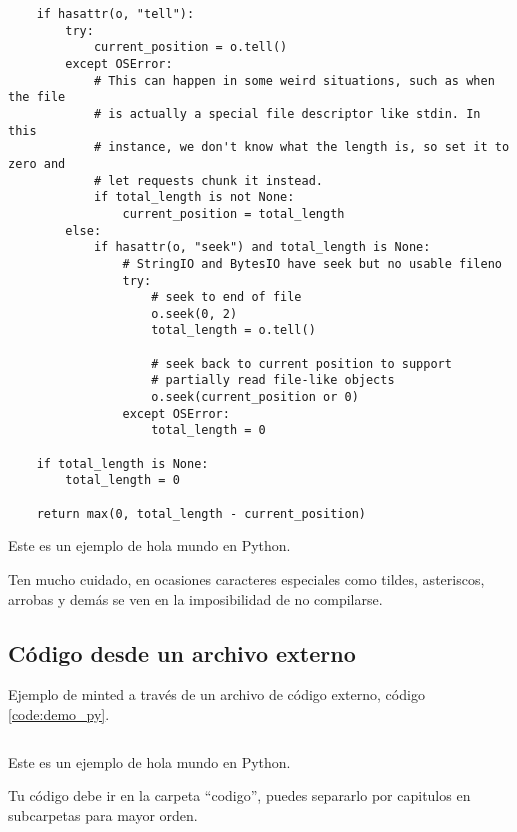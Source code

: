 \begin{code}
\begin{verbatim}
    if hasattr(o, "tell"):
        try:
            current_position = o.tell()
        except OSError:
            # This can happen in some weird situations, such as when the file
            # is actually a special file descriptor like stdin. In this
            # instance, we don't know what the length is, so set it to zero and
            # let requests chunk it instead.
            if total_length is not None:
                current_position = total_length
        else:
            if hasattr(o, "seek") and total_length is None:
                # StringIO and BytesIO have seek but no usable fileno
                try:
                    # seek to end of file
                    o.seek(0, 2)
                    total_length = o.tell()

                    # seek back to current position to support
                    # partially read file-like objects
                    o.seek(current_position or 0)
                except OSError:
                    total_length = 0

    if total_length is None:
        total_length = 0

    return max(0, total_length - current_position)
    \end{verbatim}
    \caption{Este es un ejemplo de hola mundo en Python.}
    \label{code:request_partial}
\end{code}

Ten mucho cuidado, en ocasiones caracteres especiales como tildes,
asteriscos, arrobas y demás se ven en la imposibilidad de no 
compilarse.

\subsection{Código desde un archivo externo}

Ejemplo de minted a través de un archivo de código externo, código \ref{code:demo_py}.

\begin{code}
    \inputminted[bgcolor=gray_background, xleftmargin=10pt, linenos=true, breaklines, fontsize=\footnotesize]{python}{codigo/capitulo_1/demo.py}
    \caption{Este es un ejemplo de hola mundo en Python.}
    \label{code:demo_py}
\end{code}

Tu código debe ir en la carpeta ``codigo'', puedes separarlo 
por capitulos en subcarpetas para mayor orden.